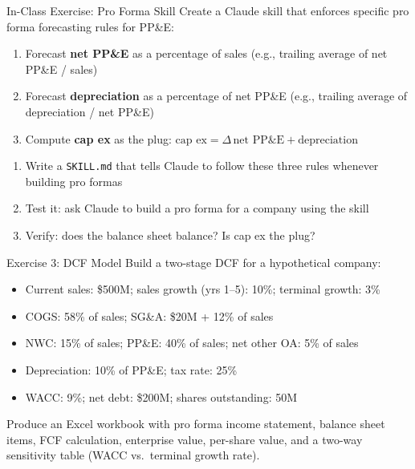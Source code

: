 \documentclass[aspectratio=169]{beamer}
\begin{document}
\begin{frame}{In-Class Exercise: Pro Forma Skill}
Create a Claude skill that enforces specific pro forma forecasting rules for PP\&E:
\vspace{0.3cm}
\begin{shadedbox}[title=\textbf{Rules to Encode in the Skill}]
\begin{enumerate}\small
  \item Forecast \textbf{net PP\&E} as a percentage of sales (e.g., trailing average of net PP\&E / sales)
  \item Forecast \textbf{depreciation} as a percentage of net PP\&E (e.g., trailing average of depreciation / net PP\&E)
  \item Compute \textbf{cap ex} as the plug: $\text{cap ex} = \Delta\,\text{net PP\&E} + \text{depreciation}$
\end{enumerate}
\end{shadedbox}
\vspace{0.3cm}
\begin{enumerate}\small
  \item Write a \texttt{SKILL.md} that tells Claude to follow these three rules whenever building pro formas
  \item Test it: ask Claude to build a pro forma for a company using the skill
  \item Verify: does the balance sheet balance?  Is cap ex the plug?
\end{enumerate}
\end{frame}

\begin{frame}{Exercise 3: DCF Model}
Build a two-stage DCF for a hypothetical company:
\vspace{0.2cm}
\begin{itemize}\small
  \item Current sales: \$500M; sales growth (yrs 1--5): 10\%; terminal growth: 3\%
  \item COGS: 58\% of sales; SG\&A: \$20M + 12\% of sales
  \item NWC: 15\% of sales; PP\&E: 40\% of sales; net other OA: 5\% of sales
  \item Depreciation: 10\% of PP\&E; tax rate: 25\%
  \item WACC: 9\%; net debt: \$200M; shares outstanding: 50M
\end{itemize}
\vspace{0.2cm}
Produce an Excel workbook with pro forma income statement, balance sheet items, FCF calculation, enterprise value, per-share value, and a two-way sensitivity table (WACC vs.\ terminal growth rate).
\end{frame}
\end{document}
